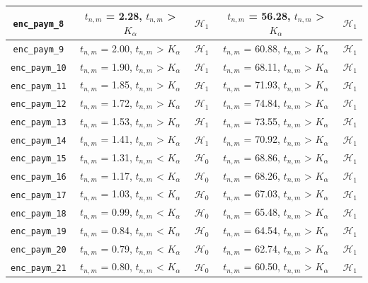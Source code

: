 \begin{table}[H]
\begin{tabular}{|c|c|c|c|c|}
		\texttt{enc\_paym\_8}  & $t_{n,m}$ = 2.28, $t_{n,m}$ > $K_\alpha$ & $\mathcal{H}_1$  & $t_{n,m}$ = 56.28, $t_{n,m}$ > $K_\alpha$ & $\mathcal{H}_1$ \\ \hline
		\texttt{enc\_paym\_9}  & $t_{n,m}$ = 2.00, $t_{n,m}$ > $K_\alpha$ & $\mathcal{H}_1$  & $t_{n,m}$ = 60.88, $t_{n,m}$ > $K_\alpha$ & $\mathcal{H}_1$ \\ \hline
		\texttt{enc\_paym\_10} & $t_{n,m}$ = 1.90, $t_{n,m}$ > $K_\alpha$ & $\mathcal{H}_1$  & $t_{n,m}$ = 68.11, $t_{n,m}$ > $K_\alpha$ & $\mathcal{H}_1$ \\ \hline
		\texttt{enc\_paym\_11} & $t_{n,m}$ = 1.85, $t_{n,m}$ > $K_\alpha$ & $\mathcal{H}_1$  & $t_{n,m}$ = 71.93, $t_{n,m}$ > $K_\alpha$ & $\mathcal{H}_1$ \\ \hline
		\texttt{enc\_paym\_12} & $t_{n,m}$ = 1.72, $t_{n,m}$ > $K_\alpha$ & $\mathcal{H}_1$  & $t_{n,m}$ = 74.84, $t_{n,m}$ > $K_\alpha$ & $\mathcal{H}_1$ \\ \hline
		\texttt{enc\_paym\_13} & $t_{n,m}$ = 1.53, $t_{n,m}$ > $K_\alpha$ & $\mathcal{H}_1$  & $t_{n,m}$ = 73.55, $t_{n,m}$ > $K_\alpha$ & $\mathcal{H}_1$ \\ \hline
		\texttt{enc\_paym\_14} & $t_{n,m}$ = 1.41, $t_{n,m}$ > $K_\alpha$ & $\mathcal{H}_1$  & $t_{n,m}$ = 70.92, $t_{n,m}$ > $K_\alpha$ & $\mathcal{H}_1$ \\ \hline
		\texttt{enc\_paym\_15} & $t_{n,m}$ = 1.31, $t_{n,m}$ < $K_\alpha$ & $\mathcal{H}_0$  & $t_{n,m}$ = 68.86, $t_{n,m}$ > $K_\alpha$ & $\mathcal{H}_1$ \\ \hline
		\texttt{enc\_paym\_16} & $t_{n,m}$ = 1.17, $t_{n,m}$ < $K_\alpha$ & $\mathcal{H}_0$  & $t_{n,m}$ = 68.26, $t_{n,m}$ > $K_\alpha$ & $\mathcal{H}_1$ \\ \hline
		\texttt{enc\_paym\_17} & $t_{n,m}$ = 1.03, $t_{n,m}$ < $K_\alpha$ & $\mathcal{H}_0$  & $t_{n,m}$ = 67.03, $t_{n,m}$ > $K_\alpha$ & $\mathcal{H}_1$ \\ \hline
		\texttt{enc\_paym\_18} & $t_{n,m}$ = 0.99, $t_{n,m}$ < $K_\alpha$ & $\mathcal{H}_0$  & $t_{n,m}$ = 65.48, $t_{n,m}$ > $K_\alpha$ & $\mathcal{H}_1$ \\ \hline
		\texttt{enc\_paym\_19} & $t_{n,m}$ = 0.84, $t_{n,m}$ < $K_\alpha$ & $\mathcal{H}_0$  & $t_{n,m}$ = 64.54, $t_{n,m}$ > $K_\alpha$ & $\mathcal{H}_1$ \\ \hline
		\texttt{enc\_paym\_20} & $t_{n,m}$ = 0.79, $t_{n,m}$ < $K_\alpha$ & $\mathcal{H}_0$  & $t_{n,m}$ = 62.74, $t_{n,m}$ > $K_\alpha$ & $\mathcal{H}_1$ \\ \hline
		\texttt{enc\_paym\_21} & $t_{n,m}$ = 0.80, $t_{n,m}$ < $K_\alpha$ & $\mathcal{H}_0$  & $t_{n,m}$ = 60.50, $t_{n,m}$ > $K_\alpha$ & $\mathcal{H}_1$ \\ \hline

\end{tabular}
\end{table}
